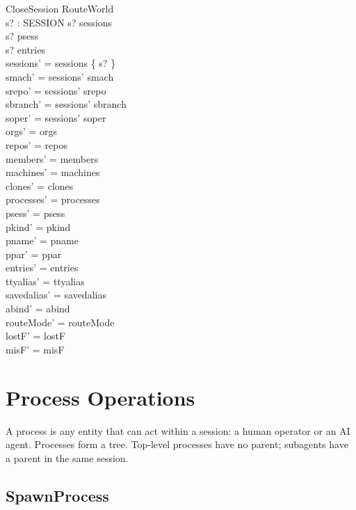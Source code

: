 \documentclass[a4paper,10pt,fleqn]{article}
\begin{document}
\begin{schema}{CloseSession}
  \Delta RouteWorld \\
  s? : SESSION
  \where
  s? \in sessions \\
  s? \notin \ran psess \\
  s? \notin entries \\
  sessions' = sessions \setminus \{ s? \} \\
  smach' = sessions' \dres smach \\
  srepo' = sessions' \dres srepo \\
  sbranch' = sessions' \dres sbranch \\
  soper' = sessions' \dres soper \\
  orgs' = orgs \\
  repos' = repos \\
  members' = members \\
  machines' = machines \\
  clones' = clones \\
  processes' = processes \\
  psess' = psess \\
  pkind' = pkind \\
  pname' = pname \\
  ppar' = ppar \\
  entries' = entries \\
  ttyalias' = ttyalias \\
  savedalias' = savedalias \\
  abind' = abind \\
  routeMode' = routeMode \\
  lostF' = lostF \\
  misF' = misF
\end{schema}

\section{Process Operations}

A process is any entity that can act within a session: a human operator
or an AI agent.  Processes form a tree.  Top-level processes have no
parent; subagents have a parent in the same session.

\subsection{SpawnProcess}
\end{document}
